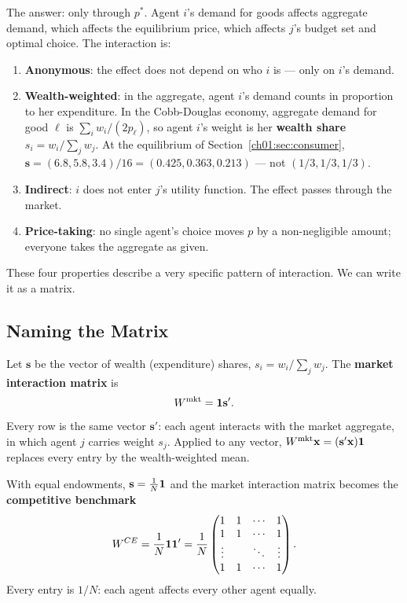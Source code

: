 \documentclass[../structural_economics_book.tex]{subfiles}
\begin{document}
The answer: only through $p^*$. Agent $i$'s demand for goods affects aggregate demand, which affects the equilibrium price, which affects $j$'s budget set and optimal choice. The interaction is:

\begin{enumerate}[label=(\alph*)]
\item \textbf{Anonymous}: the effect does not depend on who $i$ is --- only on $i$'s demand.
\item \textbf{Wealth-weighted}: in the aggregate, agent $i$'s demand counts in proportion to her expenditure. In the Cobb-Douglas economy, aggregate demand for good $\ell$ is $\sum_i w_i/(2p_\ell)$, so agent $i$'s weight is her \textbf{wealth share} $s_i = w_i/\sum_j w_j$. At the equilibrium of Section~\ref{ch01:sec:consumer}, $\mathbf{s} = (6.8, 5.8, 3.4)/16 = (0.425, 0.363, 0.213)$ --- not $(1/3, 1/3, 1/3)$.
\item \textbf{Indirect}: $i$ does not enter $j$'s utility function. The effect passes through the market.
\item \textbf{Price-taking}: no single agent's choice moves $p$ by a non-negligible amount; everyone takes the aggregate as given.
\end{enumerate}

These four properties describe a very specific pattern of interaction. We can write it as a matrix.

\subsection{Naming the Matrix}

\begin{definition}\label{ch01:def:market_W}
Let $\mathbf{s}$ be the vector of wealth (expenditure) shares, $s_i = w_i/\sum_j w_j$. The \textbf{market interaction matrix} is
\begin{equation}\label{ch01:eq:W_mkt}
W^{\text{mkt}} = \mathbf{1}\mathbf{s}'.
\end{equation}
Every row is the same vector $\mathbf{s}'$: each agent interacts with the market aggregate, in which agent $j$ carries weight $s_j$. Applied to any vector, $W^{\text{mkt}}\mathbf{x} = (\mathbf{s}'\mathbf{x})\mathbf{1}$ replaces every entry by the wealth-weighted mean.
\end{definition}

\begin{definition}\label{ch01:def:competitive_W}
With equal endowments, $\mathbf{s} = \frac{1}{N}\mathbf{1}$ and the market interaction matrix becomes the \textbf{competitive benchmark}
\begin{equation}\label{ch01:eq:W_CE}
W^{CE} = \frac{1}{N}\mathbf{1}\mathbf{1}' = \frac{1}{N}\begin{pmatrix} 1 & 1 & \cdots & 1 \\ 1 & 1 & \cdots & 1 \\ \vdots & & \ddots & \vdots \\ 1 & 1 & \cdots & 1 \end{pmatrix}.
\end{equation}
Every entry is $1/N$: each agent affects every other agent equally.
\end{definition}
\end{document}
